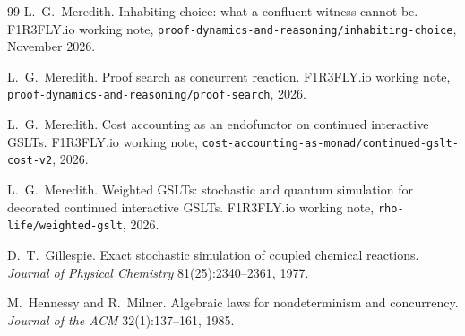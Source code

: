 \documentclass[11pt,a4paper]{article}
\theoremstyle{plain}
\theoremstyle{definition}
\theoremstyle{remark}
\begin{document}
\begin{thebibliography}{99}
L.~G.~Meredith.
\newblock Inhabiting choice: what a confluent witness cannot be.
\newblock F1R3FLY.io working note,
\texttt{proof-dynamics-and-reasoning/inhabiting-choice}, November 2026.

L.~G.~Meredith.
\newblock Proof search as concurrent reaction.
\newblock F1R3FLY.io working note,
\texttt{proof-dynamics-and-reasoning/proof-search}, 2026.

L.~G.~Meredith.
\newblock Cost accounting as an endofunctor on continued interactive GSLTs.
\newblock F1R3FLY.io working note,
\texttt{cost-accounting-as-monad/continued-gslt-cost-v2}, 2026.

L.~G.~Meredith.
\newblock Weighted GSLTs: stochastic and quantum simulation for decorated
continued interactive GSLTs.
\newblock F1R3FLY.io working note, \texttt{rho-life/weighted-gslt}, 2026.

D.~T.~Gillespie.
\newblock Exact stochastic simulation of coupled chemical reactions.
\newblock \emph{Journal of Physical Chemistry} 81(25):2340--2361, 1977.

M.~Hennessy and R.~Milner.
\newblock Algebraic laws for nondeterminism and concurrency.
\newblock \emph{Journal of the ACM} 32(1):137--161, 1985.

\end{thebibliography}
\end{document}
